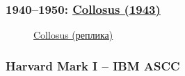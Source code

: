 \documentclass[ignorenonframetext, hyperref=unicode]{beamer}
\begin{document}
\begin{frame}
\frametitle{1940--1950: 
\href{http://en.wikipedia.org/wiki/Colossus_computer}{Collosus (1943)}}
\begin{figure}[h]
\center
{}
\caption{\href{http://en.wikipedia.org/wiki/Image:ColossusRebuild_11.jpg}{Collosus (реплика)}}
\end{figure}
\end{frame}


\subsubsection{Harvard Mark I – IBM ASCC}
\end{document}
